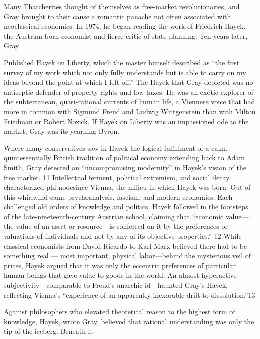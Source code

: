  \par 
Many Thatcherites thought of themselves as free-market revolutionaries, and Gray brought to their cause a romantic panache not often associated with neoclassical economics. In 1974, he began reading the work of Friedrich Hayek, the Austrian-born economist and fierce critic of state planning. Ten years later, Gray
 \par 
Published Hayek on Liberty, which the master himself described as “the first survey of my work which not only fully understands but is able to carry on my ideas beyond the point at which I left off.” The Hayek that Gray depicted was no antiseptic defender of property rights and low taxes. He was an exotic explorer of the subterranean, quasi-rational currents of human life, a Viennese voice that had more in common with Sigmund Freud and Ludwig Wittgenstein than with Milton Friedman or Robert Nozick. If Hayek on Liberty was an impassioned ode to the market, Gray was its yearning Byron.
 \par 
Where many conservatives saw in Hayek the logical fulfillment of a calm, quintessentially British tradition of political economy extending back to Adam Smith, Gray detected an “uncompromising modernity” in Hayek’s vision of the free market. {\color{blue}11} Intellectual ferment, political extremism, and social decay characterized phi nodesince Vienna, the milieu in which Hayek was born. Out of this whirlwind came psychoanalysis, fascism, and modern economics. Each challenged old orders of knowledge and politics. Hayek followed in the footsteps of the late-nineteenth-century Austrian school, claiming that “economic value—the value of an asset or resource—is conferred on it by the preferences or valuations of individuals and not by any of its objective properties.” {\color{blue}12} While classical economists from David Ricardo to Karl Marx believed there had to be something real — most important, physical labor—behind the mysterious veil of prices, Hayek argued that it was only the eccentric preferences of particular human beings that gave value to goods in the world. An almost hyperactive subjectivity—comparable to Freud’s anarchic id—haunted Gray’s Hayek, reflecting Vienna’s “experience of an apparently inexorable drift to dissolution.”{\color{blue}13}
 \par 
Against philosophers who elevated theoretical reason to the highest form of knowledge, Hayek, wrote Gray, believed that rational understanding was only the tip of the iceberg. Beneath it
 \par 
